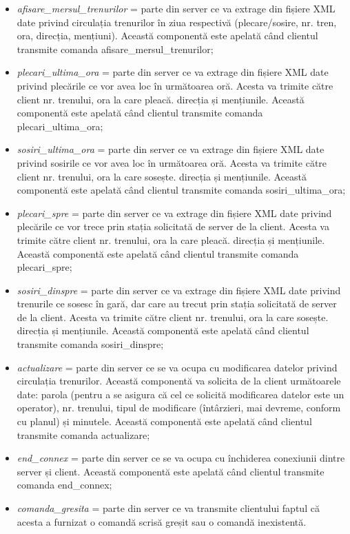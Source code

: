 \documentclass[runningheads]{llncs}
\begin{document}
\begin{itemize}
    \item \textit{afisare\_mersul\_trenurilor} = parte din server ce va extrage din fișiere XML date privind circulația trenurilor în ziua respectivă (plecare/sosire, nr. tren, ora, direcția, mențiuni). Această componentă este apelată când clientul transmite comanda afisare\_mersul\_trenurilor;
    \item \textit{plecari\_ultima\_ora} = parte din server ce va extrage din fișiere XML date privind plecările ce vor avea loc în următoarea oră. Acesta va trimite către client nr. trenului, ora la care pleacă. direcția și mențiunile. Această componentă este apelată când clientul transmite comanda plecari\_ultima\_ora;
    \item \textit{sosiri\_ultima\_ora} = parte din server ce va extrage din fișiere XML date privind sosirile ce vor avea loc în următoarea oră. Acesta va trimite către client nr. trenului, ora la care sosește. direcția și mențiunile. Această componentă este apelată când clientul transmite comanda sosiri\_ultima\_ora;
    \item \textit{plecari\_spre} = parte din server ce va extrage din fișiere XML date privind plecările ce vor trece prin stația solicitată de server de la client. Acesta va trimite către client nr. trenului, ora la care pleacă. direcția și mențiunile. Această componentă este apelată când clientul transmite comanda plecari\_spre;
    \item \textit{sosiri\_dinspre} = parte din server ce va extrage din fișiere XML date privind trenurile ce sosesc în gară, dar care au trecut prin stația solicitată de server de la client. Acesta va trimite către client nr. trenului, ora la care sosește. direcția și mențiunile. Această componentă este apelată când clientul transmite comanda sosiri\_dinspre;
    \item \textit{actualizare} = parte din server ce se va ocupa cu modificarea datelor privind circulația trenurilor. Această componentă va solicita de la client următoarele date: parola (pentru a se asigura că cel ce solicită modificarea datelor este un operator), nr. trenului, tipul de modificare (întârzieri, mai devreme, conform cu planul) și minutele. Această componentă este apelată când clientul transmite comanda actualizare;
    \item \textit{end\_connex} = parte din server ce se va ocupa cu închiderea conexiunii dintre server și client. Această componentă este apelată când clientul transmite comanda end\_connex;
    \item \textit{comanda\_gresita} = parte din server ce va transmite clientului faptul că acesta a furnizat o comandă scrisă greșit sau o comandă inexistentă.
\end{itemize}
\end{document}

